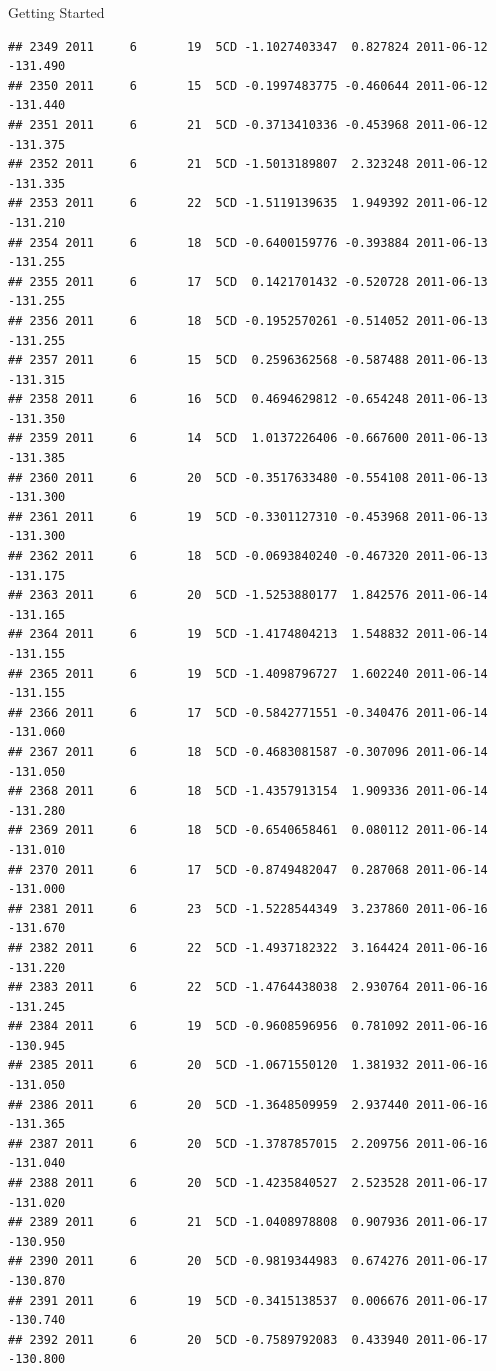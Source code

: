 \documentclass[
  ignorenonframetext,
]{beamer}
\begin{document}
\begin{frame}[fragile]{Getting Started}
\begin{verbatim}
## 2349 2011     6       19  5CD -1.1027403347  0.827824 2011-06-12 -131.490
## 2350 2011     6       15  5CD -0.1997483775 -0.460644 2011-06-12 -131.440
## 2351 2011     6       21  5CD -0.3713410336 -0.453968 2011-06-12 -131.375
## 2352 2011     6       21  5CD -1.5013189807  2.323248 2011-06-12 -131.335
## 2353 2011     6       22  5CD -1.5119139635  1.949392 2011-06-12 -131.210
## 2354 2011     6       18  5CD -0.6400159776 -0.393884 2011-06-13 -131.255
## 2355 2011     6       17  5CD  0.1421701432 -0.520728 2011-06-13 -131.255
## 2356 2011     6       18  5CD -0.1952570261 -0.514052 2011-06-13 -131.255
## 2357 2011     6       15  5CD  0.2596362568 -0.587488 2011-06-13 -131.315
## 2358 2011     6       16  5CD  0.4694629812 -0.654248 2011-06-13 -131.350
## 2359 2011     6       14  5CD  1.0137226406 -0.667600 2011-06-13 -131.385
## 2360 2011     6       20  5CD -0.3517633480 -0.554108 2011-06-13 -131.300
## 2361 2011     6       19  5CD -0.3301127310 -0.453968 2011-06-13 -131.300
## 2362 2011     6       18  5CD -0.0693840240 -0.467320 2011-06-13 -131.175
## 2363 2011     6       20  5CD -1.5253880177  1.842576 2011-06-14 -131.165
## 2364 2011     6       19  5CD -1.4174804213  1.548832 2011-06-14 -131.155
## 2365 2011     6       19  5CD -1.4098796727  1.602240 2011-06-14 -131.155
## 2366 2011     6       17  5CD -0.5842771551 -0.340476 2011-06-14 -131.060
## 2367 2011     6       18  5CD -0.4683081587 -0.307096 2011-06-14 -131.050
## 2368 2011     6       18  5CD -1.4357913154  1.909336 2011-06-14 -131.280
## 2369 2011     6       18  5CD -0.6540658461  0.080112 2011-06-14 -131.010
## 2370 2011     6       17  5CD -0.8749482047  0.287068 2011-06-14 -131.000
## 2381 2011     6       23  5CD -1.5228544349  3.237860 2011-06-16 -131.670
## 2382 2011     6       22  5CD -1.4937182322  3.164424 2011-06-16 -131.220
## 2383 2011     6       22  5CD -1.4764438038  2.930764 2011-06-16 -131.245
## 2384 2011     6       19  5CD -0.9608596956  0.781092 2011-06-16 -130.945
## 2385 2011     6       20  5CD -1.0671550120  1.381932 2011-06-16 -131.050
## 2386 2011     6       20  5CD -1.3648509959  2.937440 2011-06-16 -131.365
## 2387 2011     6       20  5CD -1.3787857015  2.209756 2011-06-16 -131.040
## 2388 2011     6       20  5CD -1.4235840527  2.523528 2011-06-17 -131.020
## 2389 2011     6       21  5CD -1.0408978808  0.907936 2011-06-17 -130.950
## 2390 2011     6       20  5CD -0.9819344983  0.674276 2011-06-17 -130.870
## 2391 2011     6       19  5CD -0.3415138537  0.006676 2011-06-17 -130.740
## 2392 2011     6       20  5CD -0.7589792083  0.433940 2011-06-17 -130.800

\end{verbatim}
\end{frame}
\end{document}

